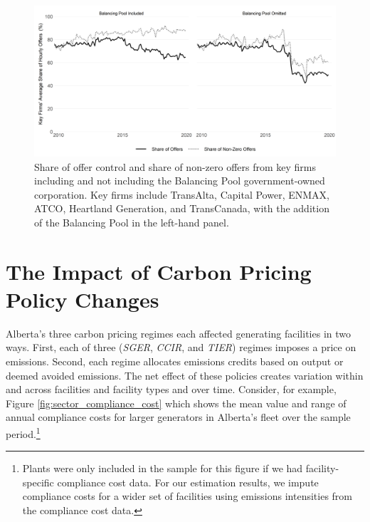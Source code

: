 \documentclass[12pt]{article}
\begin{document}
\begin{figure}[t]
    \centering
    \begin{minipage}{\textwidth}
        \centering
        \includegraphics[width=.9\textwidth]{../images/mkt_power.png}
        \caption{Share of offer control and share of non-zero offers from key firms including and not including the Balancing Pool government-owned corporation. Key firms include TransAlta, Capital Power, ENMAX, ATCO, Heartland Generation, and TransCanada, with the addition of the Balancing Pool in the left-hand panel.}
    \label{fig:synth_illust}
    \end{minipage}%
\end{figure}






\section{The Impact of Carbon Pricing Policy Changes}

Alberta's three carbon pricing regimes each affected generating facilities in two ways. First, each of three (\emph{SGER}, \emph{CCIR}, and \emph{TIER}) regimes imposes a price on emissions. Second, each regime allocates emissions credits based on output or deemed avoided emissions. The net effect of these policies creates variation within and across facilities and facility types and over time.  Consider, for example, Figure \ref{fig:sector_compliance_cost} which shows the mean value and range of annual compliance costs for larger generators in Alberta's fleet over the sample period.\footnote{Plants were only included in the sample for this figure if we had facility-specific compliance cost data. For our estimation results, we impute compliance costs for a wider set of facilities using emissions intensities from the compliance cost data.}
\end{document}

